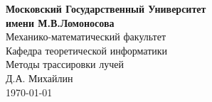 \documentclass[titlepage]{article}
\begin{document}
 

\newtheorem{theorem}{Теорема}
\newtheorem{lemma}{Лемма}
\newtheorem{definition}{Определение}
\renewcommand{\proofname}{Доказательство}

\newpage
\begin{center}
\Large \textbf{Московский Государственный Университет}\\
\hfill \break
\Large \textbf{имени М.В.Ломоносова}\\
\hfill \break
\hfill \break
\hfill \break
\hfill \break
Механико-математический факультет\\
Кафедра теоретической информатики\\
\hfill \break
\hfill \break
\hfill \break
\LARGE Методы трассировки лучей \\
\hfill \break
\large Д.А. Михайлин \\
\hfill \break
\today \\

\end{center}

\newpage
\end{document}

